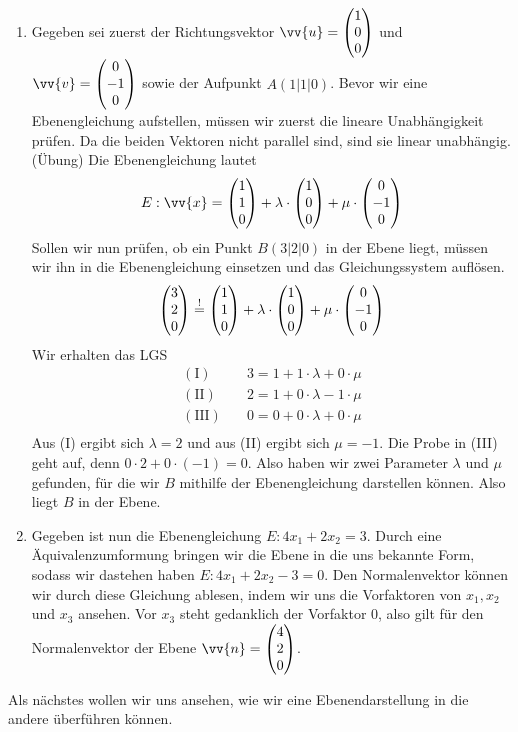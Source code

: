\documentclass[ngerman, 12pt]{nssheetxea}
\begin{document}
\begin{example} \
\begin{enumerate}
\item Gegeben sei zuerst der Richtungsvektor $\vv{u}=\colvec[1]{0}{0}$ und $\vv{v}=\colvec[0]{-1}{0}$ sowie der Aufpunkt $A(1|1|0)$. Bevor wir eine Ebenengleichung aufstellen, müssen wir zuerst die lineare Unabhängigkeit prüfen. Da die beiden Vektoren nicht parallel sind, sind sie linear unabhängig. (Übung) Die Ebenengleichung lautet
\[ E:\vv{x} = \colvec[1]{1}{0} + \lambda \cdot \colvec[1]{0}{0} + \mu \cdot \colvec[0]{-1}{0}\]
Sollen wir nun prüfen, ob ein Punkt $B(3|2|0)$ in der Ebene liegt, müssen wir ihn in die Ebenengleichung einsetzen und das Gleichungssystem auflösen.
\[ \colvec[3]{2}{0} \stackrel{!}{=} \colvec[1]{1}{0} + \lambda \cdot \colvec[1]{0}{0} + \mu \cdot \colvec[0]{-1}{0}\]
Wir erhalten das LGS
\begin{align*}
\mathrm{(I)} \quad & 3 = 1 + 1 \cdot \lambda + 0 \cdot \mu \\
\mathrm{(II)} \quad & 2 = 1 + 0 \cdot \lambda - 1 \cdot \mu \\
\mathrm{(III)} \quad & 0 = 0 + 0 \cdot \lambda + 0 \cdot \mu \\
\end{align*}
Aus (I) ergibt sich $\lambda = 2$ und aus (II) ergibt sich $\mu = -1$. Die Probe in (III) geht auf, denn $0 \cdot 2 + 0 \cdot (-1) = 0$. Also haben wir zwei Parameter $\lambda$ und $\mu$ gefunden, für die wir $B$ mithilfe der Ebenengleichung darstellen können. Also liegt $B$ in der Ebene.
\item Gegeben ist nun die Ebenengleichung $E:4x_1+2x_2=3$. Durch eine Äquivalenzumformung bringen wir die Ebene in die uns bekannte Form, sodass wir dastehen haben $E:4x_1+2x_2-3=0$. Den Normalenvektor können wir durch diese Gleichung ablesen, indem wir uns die Vorfaktoren von $x_1, x_2$ und $x_3$ ansehen. Vor $x_3$ steht gedanklich der Vorfaktor $0$, also gilt für den Normalenvektor der Ebene $\vv{n}=\colvec[4]{2}{0}$.
\end{enumerate}
\end{example}
Als nächstes wollen wir uns ansehen, wie wir eine Ebenendarstellung in die andere überführen können.
\end{document}
